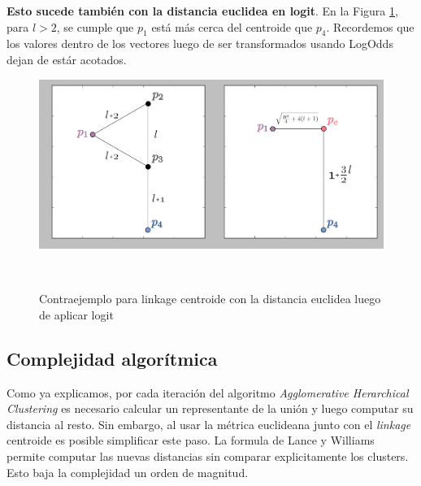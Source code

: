 \textbf{Esto sucede tambi\'en con la distancia euclidea en logit}. En la Figura
\ref{fig:euc_cen}, para $l>2$, se cumple que $p_1$ est\'a m\'as cerca del centroide
que $p_4$. Recordemos que los valores dentro de los vectores luego de ser 
transformados usando LogOdds dejan de est\'ar acotados.

\begin{figure}[h!]
                                                                                                                        
\begin{minipage}[b]{\textwidth}
    \includegraphics[width=\textwidth]{img/euclidean_centroid.png}
    \caption{Contraejemplo para linkage centroide con la distancia euclidea 
             luego de aplicar logit}
    \label{fig:euc_cen}
\end{minipage} ~

\end{figure}  

\subsection{Complejidad algor\'itmica}

Como ya explicamos, por cada iteraci\'on del algoritmo 
\textit{Agglomerative Herarchical Clustering} es necesario calcular un 
representante de la uni\'on y luego computar su distancia al resto. Sin embargo, 
al usar la m\'etrica euclideana junto con el \textit{linkage} centroide es posible
simplificar este paso. La formula de Lance y Williams permite computar las nuevas
distancias sin comparar explicitamente los clusters. Esto baja la complejidad
un orden de magnitud.


